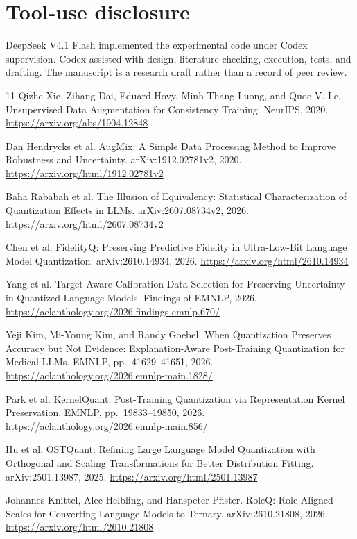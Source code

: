 \documentclass[11pt]{article}
\begin{document}
\clearpage
\section*{Tool-use disclosure}
DeepSeek V4.1 Flash implemented the experimental code under Codex supervision.
Codex assisted with design, literature checking, execution, tests, and drafting.
The manuscript is a research draft rather than a record of peer review.

\begin{thebibliography}{11}
Qizhe Xie, Zihang Dai, Eduard Hovy, Minh-Thang Luong, and Quoc V. Le.
Unsupervised Data Augmentation for Consistency Training. NeurIPS, 2020.
\url{https://arxiv.org/abs/1904.12848}

Dan Hendrycks et al. AugMix: A Simple Data Processing Method to Improve
Robustness and Uncertainty. arXiv:1912.02781v2, 2020.
\url{https://arxiv.org/html/1912.02781v2}

Baha Rababah et al. The Illusion of Equivalency: Statistical Characterization
of Quantization Effects in LLMs. arXiv:2607.08734v2, 2026.
\url{https://arxiv.org/html/2607.08734v2}

Chen et al. FidelityQ: Preserving Predictive Fidelity in Ultra-Low-Bit
Language Model Quantization. arXiv:2610.14934, 2026.
\url{https://arxiv.org/html/2610.14934}

Yang et al. Target-Aware Calibration Data Selection for Preserving Uncertainty
in Quantized Language Models. Findings of EMNLP, 2026.
\url{https://aclanthology.org/2026.findings-emnlp.670/}

Yeji Kim, Mi-Young Kim, and Randy Goebel.
When Quantization Preserves Accuracy but Not Evidence: Explanation-Aware
Post-Training Quantization for Medical LLMs. EMNLP, pp.\ 41629--41651, 2026.
\url{https://aclanthology.org/2026.emnlp-main.1828/}

Park et al. KernelQuant: Post-Training Quantization via Representation Kernel
Preservation. EMNLP, pp.\ 19833--19850, 2026.
\url{https://aclanthology.org/2026.emnlp-main.856/}

Hu et al. OSTQuant: Refining Large Language Model Quantization with Orthogonal
and Scaling Transformations for Better Distribution Fitting.
arXiv:2501.13987, 2025.
\url{https://arxiv.org/html/2501.13987}

Johannes Knittel, Alec Helbling, and Hanspeter Pfister.
RoleQ: Role-Aligned Scales for Converting Language Models to Ternary.
arXiv:2610.21808, 2026.
\url{https://arxiv.org/html/2610.21808}


\end{thebibliography}
\end{document}
